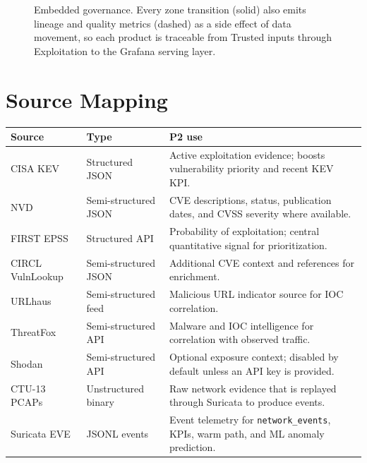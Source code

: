 \documentclass[11pt,a4paper]{article}
\newcommand{\code}[1]{\nolinkurl{#1}}
\newcommand{\hdr}{\rowcolor{csiHead}}
\begin{document}
\begin{figure}[H]
  \centering
  \caption{Embedded governance. Every zone transition (solid) also emits lineage and quality metrics (dashed) as a side effect of data movement, so each product is traceable from Trusted inputs through Exploitation to the Grafana serving layer.}
\end{figure}

\section{Source Mapping}

\begin{tabularx}{\textwidth}{>{\raggedright\arraybackslash}p{2.6cm}>{\raggedright\arraybackslash}p{2.3cm}X}
\toprule
\hdr
\textbf{Source} & \textbf{Type} & \textbf{P2 use}\\
\midrule
CISA KEV & Structured JSON & Active exploitation evidence; boosts vulnerability priority and recent KEV KPI.\\
NVD & Semi-structured JSON & CVE descriptions, status, publication dates, and CVSS severity where available.\\
FIRST EPSS & Structured API & Probability of exploitation; central quantitative signal for prioritization.\\
CIRCL VulnLookup & Semi-structured JSON & Additional CVE context and references for enrichment.\\
URLhaus & Semi-structured feed & Malicious URL indicator source for IOC correlation.\\
ThreatFox & Semi-structured API & Malware and IOC intelligence for correlation with observed traffic.\\
Shodan & Semi-structured API & Optional exposure context; disabled by default unless an API key is provided.\\
CTU-13 PCAPs & Unstructured binary & Raw network evidence that is replayed through Suricata to produce events.\\
Suricata EVE & JSONL events & Event telemetry for \code{network_events}, KPIs, warm path, and ML anomaly prediction.\\
\bottomrule
\end{tabularx}
\end{document}
